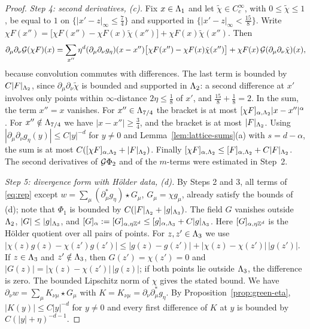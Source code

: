 \begin{proof}
\emph{Step 4: second derivatives, (c).} Fix $x\in\Lambda_1$ and let $\tilde\chi\in C^\infty_c$, with $0\le\tilde\chi\le1$, be equal to $1$ on $\{|x'-z|_\infty\le\frac74\}$ and supported in $\{|x'-z|_\infty<\frac{15}8\}$. Write $\chi F(x'')=\big[\chi F(x'')-\chi F(x)\tilde\chi(x'')\big]+\chi F(x)\tilde\chi(x'')$. Then
\[
\partial_\mu\partial_\nu\mathcal G(\chi F)(x)=\sum_{x''}\eta^d(\partial_\mu\partial_\nu g_\eta)(x-x'')\big[\chi F(x'')-\chi F(x)\tilde\chi(x'')\big]+\chi F(x)\,\mathcal G(\partial_\mu\partial_\nu\tilde\chi)(x),
\]
because convolution commutes with differences. The last term is bounded by $C|F|_{\Lambda_2}$, since $\partial_\mu\partial_\nu\tilde\chi$ is bounded and supported in $\Lambda_2$: a second difference at $x'$ involves only points within $\infty$-distance $2\eta\le\frac18$ of $x'$, and $\frac{15}8+\frac18=2$. In the sum, the term $x''=x$ vanishes. For $x''\in\Lambda_{7/4}$ the bracket is at most $[\chi F]_{\alpha,\Lambda_2}|x-x''|^\alpha$. For $x''\notin\Lambda_{7/4}$ we have $|x-x''|\ge\frac34$, and the bracket is at most $|F|_{\Lambda_2}$. Using $|\partial_\mu\partial_\nu g_\eta(y)|\le C|y|^{-d}$ for $y\ne0$ and Lemma~\ref{lem:lattice-sums}(a) with $s=d-\alpha$, the sum is at most $C([\chi F]_{\alpha,\Lambda_2}+|F|_{\Lambda_2})$. Finally $[\chi F]_{\alpha,\Lambda_2}\le[F]_{\alpha,\Lambda_2}+C|F|_{\Lambda_2}$. The second derivatives of $\mathcal G\Phi_2$ and of the $m$-terms were estimated in Step~2.

\emph{Step 5: divergence form with H\"older data, (d).} By Steps 2 and 3, all terms of \eqref{eq:rep} except $w=\sum_\mu(\partial^*_\mu g_\eta)\star G_\mu$, $G_\mu=\chi g_\mu$, already satisfy the bounds of (d); note that $\Phi_1$ is bounded by $C(|F|_{\Lambda_2}+|g|_{\Lambda_3})$. The field $G$ vanishes outside $\Lambda_2$, $|G|\le|g|_{\Lambda_3}$, and $[G]_\alpha:=[G]_{\alpha,\eta\mathbb Z^d}\le[g]_{\alpha,\Lambda_3}+C|g|_{\Lambda_3}$. Here $[G]_{\alpha,\eta\mathbb Z^d}$ is the H\"older quotient over all pairs of points. For $z,z'\in\Lambda_3$ we use $|\chi(z)g(z)-\chi(z')g(z')|\le|g(z)-g(z')|+|\chi(z)-\chi(z')|\,|g(z')|$. If $z\in\Lambda_3$ and $z'\notin\Lambda_3$, then $G(z')=\chi(z')=0$ and $|G(z)|=|\chi(z)-\chi(z')|\,|g(z)|$; if both points lie outside $\Lambda_3$, the difference is zero. The bounded Lipschitz norm of $\chi$ gives the stated bound. We have $\partial_\nu w=\sum_\mu K_{\nu\mu}\star G_\mu$ with $K=K_{\nu\mu}=\partial_\nu\partial^*_\mu g_\eta$. By Proposition~\ref{prop:green-eta}, $|K(y)|\le C|y|^{-d}$ for $y\ne0$ and every first difference of $K$ at $y$ is bounded by $C(|y|+\eta)^{-d-1}$.


\end{proof}
